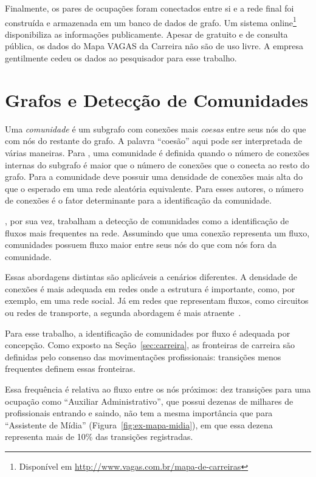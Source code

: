 \documentclass[
  article,
  11pt,
  a4paper,
  english,
  brazil,
  sumario=tradicional]{abntex2}
\begin{document}
Finalmente, os pares de ocupações foram conectados entre si e a rede final foi construída e armazenada em um banco de dados de grafo. Um sistema online\footnote{Disponível em \url{http://www.vagas.com.br/mapa-de-carreiras}} disponibiliza as informações publicamente. Apesar de gratuito e de consulta pública, os dados do Mapa VAGAS da Carreira não são de uso livre. A empresa gentilmente cedeu os dados ao pesquisador para esse trabalho.

\section{Grafos e Detecção de Comunidades} \label{sec:comunidades}

Uma \textit{comunidade} é um subgrafo com conexões mais \textit{coesas} entre seus nós do que com nós do restante do grafo. A palavra \enquote{coesão} aqui pode ser interpretada de várias maneiras. Para , uma comunidade é definida quando o número de conexões internas do subgrafo é maior que o número de conexões que o conecta ao resto do grafo. Para  a comunidade deve possuir uma densidade de conexões mais alta do que o esperado em uma rede aleatória equivalente. Para esses autores, o número de conexões é o fator determinante para a identificação da comunidade.

, por sua vez, trabalham a detecção de comunidades como a identificação de fluxos mais frequentes na rede. Assumindo que uma conexão representa um fluxo, comunidades possuem fluxo maior entre seus nós do que com nós fora da comunidade.

Essas abordagens distintas são aplicáveis a cenários diferentes. A densidade de conexões é mais adequada em redes onde a estrutura é importante, como, por exemplo, em uma rede social. Já em redes que representam fluxos, como circuitos ou redes de transporte, a segunda abordagem é mais atraente~\cite{Rosvall2009-sd}.

Para esse trabalho, a identificação de comunidades por fluxo é adequada por concepção. Como exposto na Seção~\ref{sec:carreira}, as fronteiras de carreira são definidas pelo consenso das movimentações profissionais: transições menos frequentes definem essas fronteiras.

Essa frequência é relativa ao fluxo entre os nós próximos: dez transições para uma ocupação como \enquote{Auxiliar Administrativo}, que possui dezenas de milhares de profissionais entrando e saindo, não tem a mesma importância que para \enquote{Assistente de Mídia} (Figura~\ref{fig:ex-mapa-midia}), em que essa dezena representa mais de 10\% das transições registradas.
\end{document}
